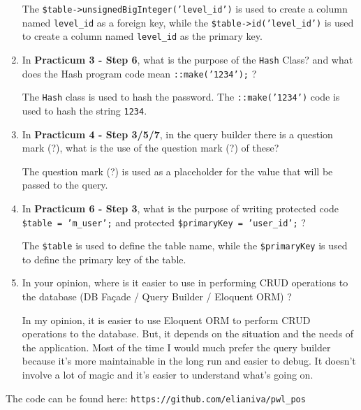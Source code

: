 \documentclass[12pt,titlepage]{article}
\begin{document}
\begin{enumerate}
{        The \texttt{\$table->unsignedBigInteger('level\_id')} is used to create a column named \texttt{level\_id} as a foreign key, while the \texttt{\$table->id('level\_id')} is used to create a column named \texttt{level\_id} as the primary key.
    }
    \pagebreak
    \item {
        In \textbf{Practicum 3 - Step 6}, what is the purpose of the \texttt{Hash} Class? and what does the Hash program code mean \texttt{::make('1234');} ?

        The \texttt{Hash} class is used to hash the password. The \texttt{::make('1234')} code is used to hash the string \texttt{1234}.
    }
    \item {
        In \textbf{Practicum 4 - Step 3/5/7}, in the query builder there is a question mark (?), what is the use of the question mark (?) of these?

        The question mark (?) is used as a placeholder for the value that will be passed to the query.
    }
    \item {
        In \textbf{Practicum 6 - Step 3}, what is the purpose of writing protected code \texttt{\$table = 'm\_user';} and protected \texttt{\$primaryKey = 'user\_id';} ?

        The \texttt{\$table} is used to define the table name, while the \texttt{\$primaryKey} is used to define the primary key of the table.
    }
    \item {
        In your opinion, where is it easier to use in performing CRUD operations to the database (DB Façade / Query Builder / Eloquent ORM) ?

        In my opinion, it is easier to use Eloquent ORM to perform CRUD operations to the database.
        But, it depends on the situation and the needs of the application.
        Most of the time I would much prefer the query builder because it's more maintainable in the long run and easier to debug.
        It doesn't involve a lot of magic and it's easier to understand what's going on.
    }
\end{enumerate}

The code can be found here: \texttt{https://github.com/elianiva/pwl\_pos}
\end{document}
